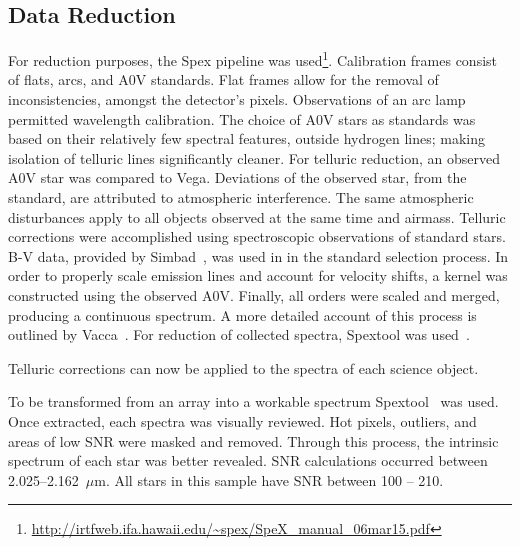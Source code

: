 \subsection{Data Reduction}

For reduction purposes, the Spex pipeline was used\footnote{\url{http://irtfweb.ifa.hawaii.edu/~spex/SpeX_manual_06mar15.pdf}}.  Calibration frames consist of flats, arcs, and A0V standards.  Flat frames allow for the removal of inconsistencies, amongst the detector's pixels.  Observations of an arc lamp permitted wavelength calibration.  The choice of A0V stars as standards was based on their relatively few spectral features, outside hydrogen lines; making isolation of telluric lines significantly cleaner.  
For telluric reduction, an observed A0V star was compared to Vega.  Deviations of the observed star, from the standard, are attributed to atmospheric interference.  The same atmospheric disturbances apply to all objects observed at the same time and airmass.  Telluric corrections were accomplished using spectroscopic observations of standard stars. B-V data, provided by Simbad~\cite{simbad}, was used in in the standard selection process.
In order to properly scale emission lines and account for velocity shifts, a kernel was constructed using the observed A0V.  Finally, all orders were scaled and merged, producing a continuous spectrum.
A more detailed account of this process is outlined by Vacca~\cite{Vacca_2003}.  
For reduction of collected spectra, Spextool was used~\cite{Cushing_2004}.  

Telluric corrections can now be applied to the spectra of each science object.~\cite{Cushing_2004}



To be transformed from an array into a workable spectrum Spextool~\cite{Cushing_2004} was used.  Once extracted, each spectra was visually reviewed.  Hot pixels, outliers, and areas of low SNR were masked and removed.  Through this process, the intrinsic spectrum of each star was better revealed.  SNR calculations occurred between 2.025--2.162~$\mu$m.  All stars in this sample have SNR between 100 -- 210.